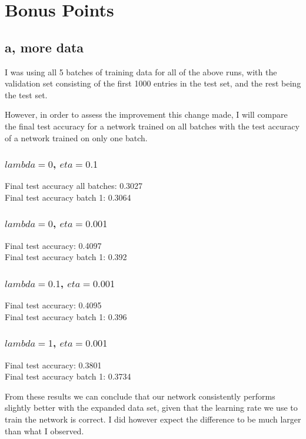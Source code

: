 \documentclass[11pt,a4paper]{article}
\begin{document}
\section{Bonus Points}

\subsection{a, more data}
I was using all 5 batches of training data for all of the above runs, with the validation set consisting of the first 1000 entries in the test set, and the rest being the test set.

However, in order to assess the improvement this change made, I will compare the final test accuracy for a network trained on all batches with the test accuracy of a network trained on only one batch.

\subsubsection{$lambda=0$, $eta=0.1$}
Final test accuracy all batches: 0.3027\\
Final test accuracy batch 1: 0.3064

\subsubsection{$lambda=0$, $eta=0.001$}
Final test accuracy: 0.4097\\
Final test accuracy batch 1: 0.392


\subsubsection{$lambda=0.1$, $eta=0.001$}
Final test accuracy: 0.4095\\
Final test accuracy batch 1: 0.396


\subsubsection{$lambda=1$, $eta=0.001$}
Final test accuracy: 0.3801\\
Final test accuracy batch 1: 0.3734

From these results we can conclude that our network consistently performs slightly better with the expanded data set, given that the learning rate we use to train the network is correct. I did however expect the difference to be much larger than what I observed.
\end{document}
